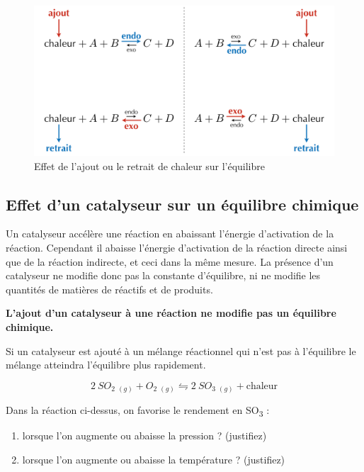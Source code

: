 \documentclass[
  11pt,
  a4paper,
  openany]{book}
\providecommand{\tightlist}{%
  \setlength{\itemsep}{0pt}\setlength{\parskip}{0pt}}
\begin{document}
\begin{figure}

{\centering \includegraphics[width=0.75\linewidth]{images/equilibres-temperature-1} 

}

\caption{Effet de l'ajout ou le retrait de chaleur sur l'équilibre}\label{fig:equilibres-temperature-1}
\end{figure}

\hypertarget{effet-dun-catalyseur-sur-un-uxe9quilibre-chimique}{%
\subsection{Effet d'un catalyseur sur un équilibre chimique}\label{effet-dun-catalyseur-sur-un-uxe9quilibre-chimique}}

Un catalyseur accélère une réaction en abaissant l'énergie d'activation de la réaction. Cependant il abaisse l'énergie d'activation de la réaction directe ainsi que de la réaction indirecte, et ceci dans la même mesure. La présence d'un catalyseur ne modifie donc pas la constante d'équilibre, ni ne modifie les quantités de matières de réactifs et de produits.

\textbf{L'ajout d'un catalyseur à une réaction ne modifie pas un équilibre chimique.}

Si un catalyseur est ajouté à un mélange réactionnel qui n'est pas à l'équilibre le mélange atteindra l'équilibre plus rapidement.

\begin{Exercise}

\[
  2\ SO_2\ _{(g)} + O_2\ _{(g)} \leftrightharpoons 2\ SO_3\ _{(g)} + \text{chaleur}
\]

Dans la réaction ci-dessus, on favorise le rendement en SO\textsubscript{3} :

\begin{enumerate}
\def\labelenumi{\alph{enumi}.}
\tightlist
\item
  lorsque l'on augmente ou abaisse la pression ? (justifiez)
\item
  lorsque l'on augmente ou abaisse la température ? (justifiez)
\end{enumerate}

\end{Exercise}
\end{document}
